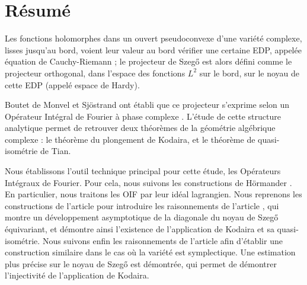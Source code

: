 

\begingroup
\let\clearpage\relax
\let\cleardoublepage\relax
\let\cleardoublepage\relax

\chapter*{Résumé}
	Les fonctions holomorphes dans un ouvert pseudoconvexe d'une
        variété complexe, lisses jusqu'au bord, voient leur valeur au bord vérifier une certaine EDP, appelée équation de Cauchy-Riemann ; le projecteur de Szeg\H{o} est alors  défini comme le projecteur orthogonal, dans l'espace des fonctions $L^2$ sur
	le bord, sur le noyau de cette EDP (appelé espace de Hardy).
	
	Boutet de Monvel et Sjöstrand ont établi que ce projecteur
        s'exprime selon un Opérateur Intégral de Fourier à phase complexe \cite{BoutetdeMonvel1975}. L'étude de cette structure analytique permet de retrouver deux théorèmes de la géométrie algébrique complexe : le théorème du plongement de Kodaira, et le théorème de quasi-isométrie de Tian.
	
	Nous établissons l'outil technique principal pour cette étude,
        les Opérateurs Intégraux de Fourier. Pour cela, nous suivons
        les constructions de H\"ormander \cite{hormander2003analysis,
          hormander2007, hormander1985}. En particulier, nous traitons les OIF par leur idéal lagrangien. Nous reprenons les constructions de l'article \cite{BoutetdeMonvel1975} pour introduire les raisonnements de l'article \cite{Zelditch2000}, qui montre un développement asymptotique de la diagonale du noyau de Szeg\H{o} équivariant, et démontre ainsi l'existence de l'application de Kodaira et sa quasi-isométrie. Nous suivons enfin les raisonnements de l'article \cite{Shiffman2002} afin d'établir une construction similaire dans le cas où la variété est symplectique. Une estimation plus précise sur le noyau de Szeg\H{o} est démontrée, qui permet de démontrer l'injectivité de l'application de Kodaira.
\endgroup			

\vfill
